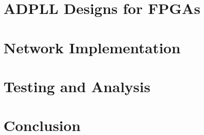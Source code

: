 \documentclass[11pt,british]{report}
\begin{document}


\setcounter{chapter}{2}

\chapter{ADPLL Designs for FPGAs}\label{chap:3}



\setcounter{chapter}{3}

\chapter{Network Implementation}\label{chap:4}



\setcounter{chapter}{4}

\chapter{Testing and Analysis}\label{chap:5}



\setcounter{chapter}{5}

\chapter{Conclusion}\label{chap:6}



\setcounter{chapter}{6}

\pagebreak{}
{}
\fancyhead[LO,RE]{\slshape \nouppercase{\leftmark}}

\end{document}
